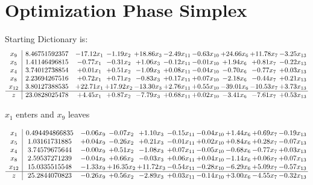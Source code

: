 \documentclass[9pt]{article}
\begin{document}
\section{Optimization Phase Simplex}
Starting Dictionary is:
\[\begin{array}{c| c c@{\hskip 2pt} c@{\hskip 2pt} c@{\hskip 2pt} c@{\hskip 2pt} c@{\hskip 2pt} c@{\hskip 2pt} c@{\hskip 2pt} c@{\hskip 2pt} }
 x_{9}   &  8.46751592357 & -17.12 x_{1} & -1.19 x_{2} & + 18.86 x_{3} & -2.49 x_{11} & -0.63 x_{10} & + 24.66 x_{6} & + 11.78 x_{7} & -3.25 x_{13}\\
 x_{5}   &  1.41146496815 & -0.77 x_{1} & -0.31 x_{2} & +  1.06 x_{3} & -0.12 x_{11} & -0.01 x_{10} & +  1.94 x_{6} & +  0.81 x_{7} & -0.22 x_{13}\\
 x_{4}   &  3.74012738854 & +  0.01 x_{1} & +  0.51 x_{2} & -1.09 x_{3} & +  0.08 x_{11} & -0.04 x_{10} & -0.70 x_{6} & -0.77 x_{7} & +  0.03 x_{13}\\
 x_{8}   &  2.23694267516 & +  0.72 x_{1} & +  0.71 x_{2} & -0.83 x_{3} & +  0.17 x_{11} & +  0.07 x_{10} & -2.18 x_{6} & -0.44 x_{7} & +  0.21 x_{13}\\
 x_{12}   &  3.80127388535 & + 22.71 x_{1} & + 17.92 x_{2} & -13.30 x_{3} & +  2.76 x_{11} & +  0.55 x_{10} & -39.01 x_{6} & -10.53 x_{7} & +  3.73 x_{13}\\
\hline
z    &  23.0828025478 & +  4.45 x_{1} & +  0.87 x_{2} & -7.79 x_{3} & +  0.68 x_{11} & +  0.02 x_{10} & -3.41 x_{6} & -7.61 x_{7} & +  0.53 x_{13}\\
\end{array}\]


 $ x_{1} $ enters and $ x_{9} $ leaves 

 \[\begin{array}{c| c c@{\hskip 2pt} c@{\hskip 2pt} c@{\hskip 2pt} c@{\hskip 2pt} c@{\hskip 2pt} c@{\hskip 2pt} c@{\hskip 2pt} c@{\hskip 2pt} }
 x_{1}   &  0.494494866835 & -0.06 x_{9} & -0.07 x_{2} & +  1.10 x_{3} & -0.15 x_{11} & -0.04 x_{10} & +  1.44 x_{6} & +  0.69 x_{7} & -0.19 x_{13}\\
 x_{5}   &  1.03161731885 & +  0.04 x_{9} & -0.26 x_{2} & +  0.21 x_{3} & -0.01 x_{11} & +  0.02 x_{10} & +  0.84 x_{6} & +  0.28 x_{7} & -0.07 x_{13}\\
 x_{4}   &  3.74579675644 & -0.00 x_{9} & +  0.51 x_{2} & -1.08 x_{3} & +  0.07 x_{11} & -0.05 x_{10} & -0.68 x_{6} & -0.77 x_{7} & +  0.03 x_{13}\\
 x_{8}   &  2.59537271239 & -0.04 x_{9} & +  0.66 x_{2} & -0.03 x_{3} & +  0.06 x_{11} & +  0.04 x_{10} & -1.14 x_{6} & +  0.06 x_{7} & +  0.07 x_{13}\\
 x_{12}   &  15.0335515548 & -1.33 x_{9} & + 16.35 x_{2} & + 11.72 x_{3} & -0.54 x_{11} & -0.28 x_{10} & -6.29 x_{6} & +  5.09 x_{7} & -0.57 x_{13}\\
\hline
z    &  25.2844070823 & -0.26 x_{9} & +  0.56 x_{2} & -2.89 x_{3} & +  0.03 x_{11} & -0.14 x_{10} & +  3.00 x_{6} & -4.55 x_{7} & -0.32 x_{13}\\
\end{array}\]
\end{document}
